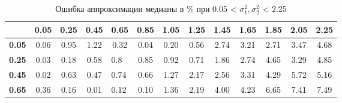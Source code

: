\documentclass[12pt]{article}
\begin{document}
\begin{table}[]
	\caption{Ошибка аппроксимации медианы в \% при 0.05 < $\sigma_{1}^{2}, \sigma_{2}^{2}$ < 2.25 }
	\begin{tabular}{|c|ccclcccccccc}
		\hline
		\textbf{}                         & \multicolumn{1}{c|}{\textbf{0.05}} & \multicolumn{1}{c|}{\textbf{0.25}} & \multicolumn{1}{c|}{\textbf{0.45}} & \multicolumn{1}{l|}{\textbf{0.65}} & \multicolumn{1}{c|}{\textbf{0.85}} & \multicolumn{1}{c|}{\textbf{1.05}} & \multicolumn{1}{c|}{\textbf{1.25}} & \multicolumn{1}{c|}{\textbf{1.45}} & \multicolumn{1}{c|}{\textbf{1.65}} & \multicolumn{1}{c|}{\textbf{1.85}} & \multicolumn{1}{c|}{\textbf{2.05}} & \multicolumn{1}{c|}{\textbf{2.25}} \\ \hline
		\textbf{0.05}                       & 0.06                               & 0.95                               & 1.22                               & \multicolumn{1}{c}{0.32}           & 0.04                               & 0.20                               & 0.56                               & 2.74                               & 3.21                               & 2.71                               & 3.47                               & 4.68                               \\ \cline{1-1}
		\textbf{0.25}                       & 0.03                               & 0.18                               & 0.58                               & 0.8                                & 0.85                               & 0.92                               & 0.71                               & 1.86                               & 2.74                               & 4.65                               & 3.29                               & 4.85                               \\ \cline{1-1}
		\textbf{0.45}                       & 0.02                               & 0.63                               & 0.47                               & 0.74                               & 0.66                               & 1.27                               & 2.17                               & 2.56                               & 3.31                               & 4.29                               & 5.72                               & 5.16                               \\ \cline{1-1}
		\textbf{0.65}                       & 0.36                               & 0.16                               & 0.01                               & 0.12                               & 0.10                               & 1.36                               & 2.19                               & 4.00                               & 4.23                               & 6.65                               & 7.41                               & 7.49                               \\ \cline{1-1}

\end{tabular}
\end{table}
\end{document}
